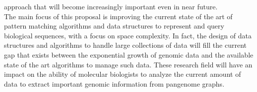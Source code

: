 \documentclass[a4paper,11pt, oneside]{article}
\newcommand{\pb}[1]{\todo[backgroundcolor=red]{\textbf{PB} #1}}
\newcommand{\dc}[1]{\todo[backgroundcolor=yellow]{\textbf{DC} #1}}
\begin{document}
approach that will become increasingly important even in near future.\\ 
The main focus of this proposal is improving the current state of the art
of pattern matching algorithms and data structures to represent and query
biological sequences, with a focus on space 
complexity. In fact, the design of data structures and algorithms to handle
large collections of data will fill the current gap that exists between the
exponential growth of genomic data and the available state of the art algorithms
to manage  
such data. These research field will have an impact on the ability of
molecular biologists to analyze the current amount of data to extract important
genomic information from pangenome graphs. 
\end{document}
